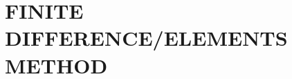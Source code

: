 \documentclass{book}
\begin{document}






















\section{FINITE DIFFERENCE/ELEMENTS METHOD}









%

%

%

%


\end{document}
